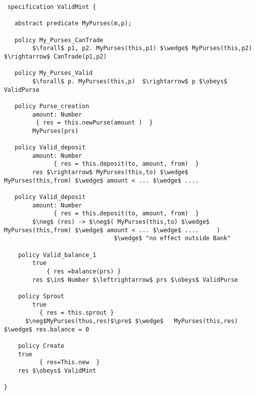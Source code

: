 \begin{minipage}{\textwidth}
\begin{lstlisting}
 specification ValidMint {

   abstract predicate MyPurses(m,p);
   
   policy My_Purses_CanTrade
		$\forall$ p1, p2. MyPurses(this,p1) $\wedge$ MyPurses(this,p2) $\rightarrow$ CanTrade(p1,p2)
   
   policy My_Purses_Valid
		$\forall$ p. MyPurses(this,p)  $\rightarrow$ p $\obeys$ ValidPurse

   policy Purse_creation
        amount: Number
   	     { res = this.newPurse(amount )  }
        MyPurses(prs)

   policy Valid_deposit
        amount: Number
              { res = this.deposit(to, amount, from)  }
        res $\rightarrow$ MyPurses(this,to) $\wedge$ MyPurses(this,from) $\wedge$ amount < ... $\wedge$ ....     

   policy Valid_deposit
        amount: Number
              { res = this.deposit(to, amount, from)  }
        $\neg$ (res) -> $\neg$( MyPurses(this,to) $\wedge$ MyPurses(this,from) $\wedge$ amount < ... $\wedge$ ....     )
                               $\wedge$ "no effect outside Bank"

    policy Valid_balance_1
        true
            { res =balance(prs) }
        res $\in$ Number $\leftrightarrow$ prs $\obeys$ ValidPurse  
  
    policy Sprout
        true
          { res = this.sprout }
      $\neg$MyPurses(thus,res)$\pre$ $\wedge$   MyPurses(this,res)  $\wedge$ res.balance = 0
  
    policy Create
    true
          { res=This.new  }
    res $\obeys$ ValidMint

}
\end{lstlisting}
\end{minipage}
 


